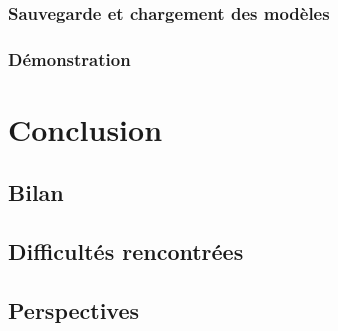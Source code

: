 \documentclass[12pt, a4paper]{report}
\begin{document}

\subsection{Sauvegarde et chargement des modèles}


\subsection{Démonstration}


\chapter{Conclusion}


\section{Bilan}

\section{Difficultés rencontrées}

\section{Perspectives}

\end{document}
